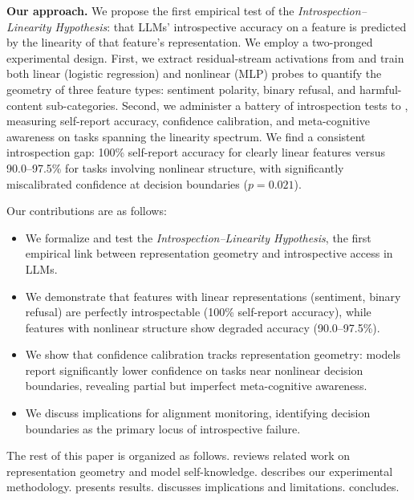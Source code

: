 {\bf Our approach.} We propose the first empirical test of the \emph{Introspection--Linearity Hypothesis}: that LLMs' introspective accuracy on a feature is predicted by the linearity of that feature's representation. We employ a two-pronged experimental design. First, we extract residual-stream activations from \qwen and train both linear (logistic regression) and nonlinear (MLP) probes to quantify the geometry of three feature types: sentiment polarity, binary refusal, and harmful-content sub-categories. Second, we administer a battery of introspection tests to \gptfour, measuring self-report accuracy, confidence calibration, and meta-cognitive awareness on tasks spanning the linearity spectrum. We find a consistent introspection gap: 100\% self-report accuracy for clearly linear features versus 90.0--97.5\% for tasks involving nonlinear structure, with significantly miscalibrated confidence at decision boundaries ($p = 0.021$).

Our contributions are as follows:
\begin{itemize}[leftmargin=*,itemsep=0pt,topsep=0pt]
    \item We formalize and test the \emph{Introspection--Linearity Hypothesis}, the first empirical link between representation geometry and introspective access in LLMs.
    \item We demonstrate that features with linear representations (sentiment, binary refusal) are perfectly introspectable (100\% self-report accuracy), while features with nonlinear structure show degraded accuracy (90.0--97.5\%).
    \item We show that confidence calibration tracks representation geometry: models report significantly lower confidence on tasks near nonlinear decision boundaries, revealing partial but imperfect meta-cognitive awareness.
    \item We discuss implications for alignment monitoring, identifying decision boundaries as the primary locus of introspective failure.
\end{itemize}

The rest of this paper is organized as follows.  reviews related work on representation geometry and model self-knowledge.  describes our experimental methodology.  presents results.  discusses implications and limitations.  concludes.
